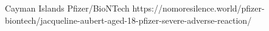           {
            Cayman Islands
          }
          {
          }
          {
            Pfizer/BioNTech
          }
          {
          }
          {
          }
          {
            https://nomoresilence.world/pfizer-biontech/jacqueline-aubert-aged-18-pfizer-severe-adverse-reaction/
          }

